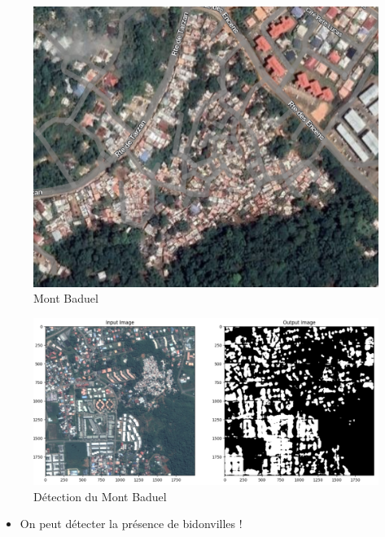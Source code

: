 \documentclass[
  letterpaper,
  DIV=11,
  numbers=noendperiod]{scrreprt}
\providecommand{\tightlist}{%
  \setlength{\itemsep}{0pt}\setlength{\parskip}{0pt}}\usepackage{longtable,booktabs,array}
\begin{document}
\begin{figure}[H]

{\centering \includegraphics{figures/MontBaduel_2.png}

}

\caption{\label{fig-mont-baduel}Mont Baduel}

\end{figure}

\begin{figure}[H]

{\centering \includegraphics{figures/Detection_mont_baduel.png}

}

\caption{\label{fig-detec-mont-baduel}Détection du Mont Baduel}

\end{figure}

\begin{itemize}
\tightlist
\item
  On peut détecter la présence de bidonvilles !
\end{itemize}
\end{document}
